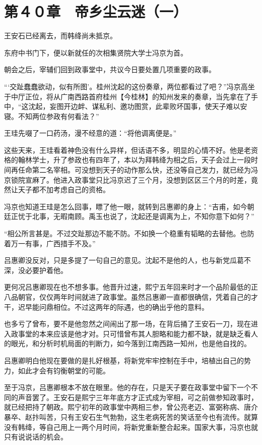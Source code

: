 \section{第４０章　帝乡尘云迷（一）}

王安石已经离去，而韩绛尚未抵京。

东府中书门下，便以新就任的次相集贤院大学士冯京为首。

朝会之后，宰辅们回到政事堂中，共议今日要处置几项重要的政事。

“‘交趾蠢蠢欲动，似有所图’。桂州沈起的这份奏章，两位都看过了吧？”冯京高坐于中厅正位，将从广南西路首府桂州【今桂林】的知州发来的奏章，当先拿在了手中，“这沈起，妄图开边衅、谋私利、邀功图赏，此辈败坏国事，使天子难以安寝。不知两位参政有何看法？”

王珪先啜了一口药汤，漫不经意的道：“将他调离便是。”

这些天来，王珪看着神色没有什么异样，但话语不多，明显的心情不好。他是老资格的翰林学士，升了参政也有四年了，本以为拜韩绛为相之后，天子会过上一段时间再任命第二名宰相。可没想到天子的动作那么快，还没等自己发力，就已经为冯京锁院宣麻了。他进入政事堂只比冯京迟了三个月，没想到区区三个月的时差，竟然让天子都不加考虑自己的资格。

冯京也知道王珪是怎么回事，瞟了他一眼，就转到吕惠卿的身上：“吉甫，如今朝廷正忧于北事，无暇南顾。禹玉也说了，沈起还是调离为上，不知你意下如何？”

“相公所言甚是。不过交趾那边不能不防。不如换一个稳重有韬略的去替他。也防着万一有事，广西措手不及。”

吕惠卿没反对，只是多提了一句自己的意见。沈起不是他的人，也与新党瓜葛不深，没必要护着他。

更何况吕惠卿现在也不想多事。他晋升过速，熙宁五年回来时才一个品阶最低的正八品朝官，仅仅两年时间就进了政事堂。虽然吕惠卿一直都很确信，凭着自己的才干，迟早能问鼎相位。不过这两年的际遇，也的确出乎他的意料。

也多亏了曾布，要不是他忽然之间闹出了那一场，在背后捅了王安石一刀，现在进入政事堂的本来应该是他才对。只可惜曾布其人胆略和能力都不缺，就是缺乏看人的眼光，和分析时机局面的判断力，如今落到江南西路一知州，也是他自找的。

吕惠卿明白他现在要做的是扎好根基，将新党牢牢控制在手中，培植出自己的势力，如此才会有钧衡朝堂的可能。

至于冯京，吕惠卿根本不放在眼里。他的存在，只是天子要在政事堂中留下一个不同的声音罢了。王安石是熙宁三年年底方才正式成为宰相，可之前做参知政事时，就已经把持了朝政。熙宁初年的政事堂中两相三参，曾公亮老迈、富弼称病、唐介暴卒、赵抃叫苦，只有王安石生气勃勃，这生老病死苦的笑话至今也有流传。就算没有韩绛，等自己用上一两个月时间，将新党重新整合起来。国家大事，冯京也就只有说说话的机会。

